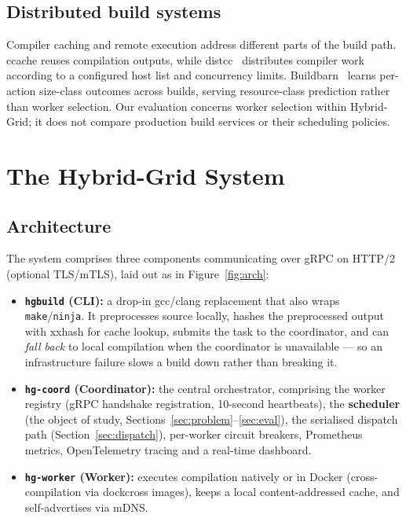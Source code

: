 \documentclass[final,5p,times,twocolumn]{elsarticle}
\begin{document}
\subsection{Distributed build systems}

Compiler caching and remote execution address different parts of the build path. ccache reuses compilation outputs, while distcc~\cite{distcc} distributes compiler work according to a configured host list and concurrency limits. Buildbarn~\cite{buildbarn} learns per-action size-class outcomes across builds, serving resource-class prediction rather than worker selection. Our evaluation concerns worker selection within Hybrid-Grid; it does not compare production build services or their scheduling policies.

\section{The Hybrid-Grid System}
\label{sec:system}

\subsection{Architecture}

The system comprises three components communicating over gRPC on HTTP/2 (optional TLS/mTLS), laid out as in Figure~\ref{fig:arch}:

\begin{itemize}
\item \textbf{\texttt{hgbuild} (CLI):} a drop-in gcc/clang replacement that also wraps \texttt{make}/\texttt{ninja}. It preprocesses source locally, hashes the preprocessed output with xxhash for cache lookup, submits the task to the coordinator, and can \emph{fall back} to local compilation when the coordinator is unavailable --- so an infrastructure failure slows a build down rather than breaking it.
\item \textbf{\texttt{hg-coord} (Coordinator):} the central orchestrator, comprising the worker registry (gRPC handshake registration, 10-second heartbeats), the \textbf{scheduler} (the object of study, Sections~\ref{sec:problem}--\ref{sec:eval}), the serialised dispatch path (Section~\ref{sec:dispatch}), per-worker circuit breakers, Prometheus metrics, OpenTelemetry tracing and a real-time dashboard.
\item \textbf{\texttt{hg-worker} (Worker):} executes compilation natively or in Docker (cross-compilation via dockcross images), keeps a local content-addressed cache, and self-advertises via mDNS.
\end{itemize}
\end{document}
